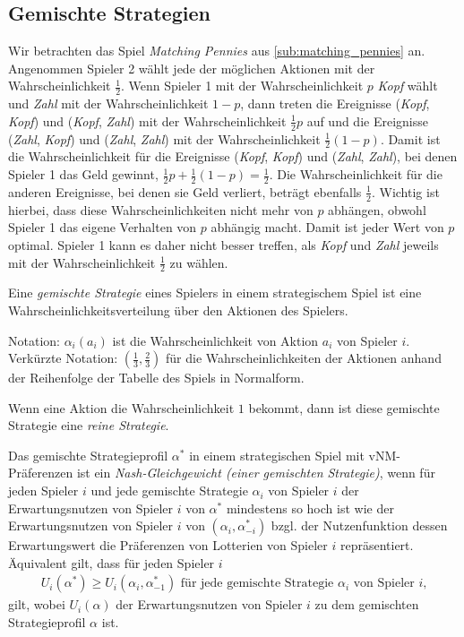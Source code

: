 \subsection{Gemischte Strategien}%
\label{sub:gemischte_strategien}

Wir betrachten das Spiel \emph{Matching Pennies} aus \ref{sub:matching_pennies} an.
Angenommen Spieler 2 wählt jede der möglichen Aktionen mit der Wahrscheinlichkeit
$\frac{1}{2}$.
Wenn Spieler 1 mit der Wahrscheinlichkeit $p$ \emph{Kopf} wählt und \emph{Zahl} mit der
Wahrscheinlichkeit $1-p$, dann treten die Ereignisse
(\emph{Kopf}, \emph{Kopf}) und (\emph{Kopf}, \emph{Zahl})
mit der Wahrscheinlichkeit $\frac{1}{2}p$ auf und die Ereignisse
(\emph{Zahl}, \emph{Kopf}) und (\emph{Zahl}, \emph{Zahl})
mit der Wahrscheinlichkeit $\frac{1}{2}(1-p)$.
Damit ist die Wahrscheinlichkeit für die Ereignisse
(\emph{Kopf}, \emph{Kopf}) und (\emph{Zahl}, \emph{Zahl}),
bei denen Spieler 1 das Geld gewinnt,
$\frac{1}{2}p + \frac{1}{2}(1-p) = \frac{1}{2}$.
Die Wahrscheinlichkeit für die anderen Ereignisse, bei denen sie Geld verliert, beträgt
ebenfalls $\frac{1}{2}$.
Wichtig ist hierbei, dass diese Wahrscheinlichkeiten nicht mehr von $p$ abhängen, obwohl
Spieler 1 das eigene Verhalten von $p$ abhängig macht.
Damit ist jeder Wert von $p$ optimal.
Spieler 1 kann es daher nicht besser treffen, als \emph{Kopf} und \emph{Zahl} jeweils mit
der Wahrscheinlichkeit $\frac{1}{2}$ zu wählen.

\begin{definition}
  Eine \emph{gemischte Strategie} eines Spielers in einem strategischem Spiel ist eine
  Wahrscheinlichkeitsverteilung über den Aktionen des Spielers.

  Notation: $α_i(a_i)$ ist die Wahrscheinlichkeit von Aktion $a_i$ von Spieler $i$.
  Verkürzte Notation: $\left( \frac{1}{3}, \frac{2}{3} \right)$ für die
  Wahrscheinlichkeiten der Aktionen anhand der Reihenfolge der Tabelle des Spiels in
  Normalform.
\end{definition}

Wenn eine Aktion die Wahrscheinlichkeit $1$ bekommt, dann ist diese gemischte Strategie
eine \emph{reine Strategie}.

\begin{definition}
  Das gemischte Strategieprofil $α^*$ in einem strategischen Spiel mit vNM-Präferenzen ist
  ein \emph{Nash-Gleichgewicht (einer gemischten Strategie)},
  wenn für jeden Spieler $i$ und jede gemischte Strategie $α_i$ von Spieler $i$
  der Erwartungsnutzen von Spieler $i$ von $α^*$ mindestens so hoch ist
  wie der Erwartungsnutzen von Spieler $i$ von $(α_i, α^*_{-i})$
  bzgl. der Nutzenfunktion dessen Erwartungswert die Präferenzen von Lotterien
  von Spieler $i$ repräsentiert.
  Äquivalent gilt, dass für jeden Spieler $i$
  \begin{align*}
    U_i(α^*) \geq U_i(α_i, α^*_{-1}) \text{ für jede gemischte Strategie $α_i$ von Spieler
    $i$,}
  \end{align*}
  gilt, wobei $U_i(α)$ der Erwartungsnutzen von Spieler $i$ zu dem gemischten
  Strategieprofil $α$ ist.
\end{definition}

